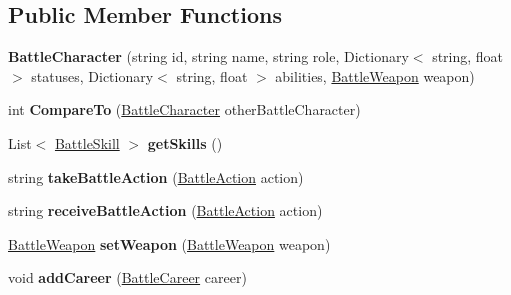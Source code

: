 \subsection*{Public Member Functions}
\begin{DoxyCompactItemize}
\item 
{\bfseries Battle\+Character} (string id, string name, string role, Dictionary$<$ string, float $>$ statuses, Dictionary$<$ string, float $>$ abilities, \hyperlink{classdoki_battle_1_1_battle_weapon}{Battle\+Weapon} weapon)\hypertarget{classdoki_battle_1_1_battle_character_a0c178020e8d78174b5dbe85368593f96}{}\label{classdoki_battle_1_1_battle_character_a0c178020e8d78174b5dbe85368593f96}

\item 
int {\bfseries Compare\+To} (\hyperlink{classdoki_battle_1_1_battle_character}{Battle\+Character} other\+Battle\+Character)\hypertarget{classdoki_battle_1_1_battle_character_a165a8277fef3de677c58ffbb043422b4}{}\label{classdoki_battle_1_1_battle_character_a165a8277fef3de677c58ffbb043422b4}

\item 
List$<$ \hyperlink{classdoki_battle_1_1_battle_skill}{Battle\+Skill} $>$ {\bfseries get\+Skills} ()\hypertarget{classdoki_battle_1_1_battle_character_a4b011b319e50811dedb40d73bf633bdf}{}\label{classdoki_battle_1_1_battle_character_a4b011b319e50811dedb40d73bf633bdf}

\item 
string {\bfseries take\+Battle\+Action} (\hyperlink{classdoki_battle_1_1_battle_action}{Battle\+Action} action)\hypertarget{classdoki_battle_1_1_battle_character_ad0a3be1d09e449b65a3eb707d986c033}{}\label{classdoki_battle_1_1_battle_character_ad0a3be1d09e449b65a3eb707d986c033}

\item 
string {\bfseries receive\+Battle\+Action} (\hyperlink{classdoki_battle_1_1_battle_action}{Battle\+Action} action)\hypertarget{classdoki_battle_1_1_battle_character_ae934b7933903c5e736df89638e4d0a8f}{}\label{classdoki_battle_1_1_battle_character_ae934b7933903c5e736df89638e4d0a8f}

\item 
\hyperlink{classdoki_battle_1_1_battle_weapon}{Battle\+Weapon} {\bfseries set\+Weapon} (\hyperlink{classdoki_battle_1_1_battle_weapon}{Battle\+Weapon} weapon)\hypertarget{classdoki_battle_1_1_battle_character_adee22f3b3479af41e4603a99b9bc28d9}{}\label{classdoki_battle_1_1_battle_character_adee22f3b3479af41e4603a99b9bc28d9}

\item 
void {\bfseries add\+Career} (\hyperlink{classdoki_battle_1_1_battle_career}{Battle\+Career} career)\hypertarget{classdoki_battle_1_1_battle_character_acf264db06138fba216bf75f93eef9640}{}\label{classdoki_battle_1_1_battle_character_acf264db06138fba216bf75f93eef9640}

\end{DoxyCompactItemize}
